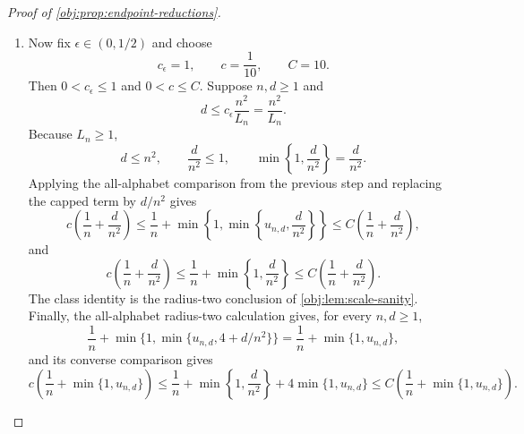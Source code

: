 \documentclass[11pt]{article}
\begin{document}
\begin{proof}[Proof of \cref{obj:prop:endpoint-reductions}]
\begin{enumerate}
\item Now fix \(\epsilon\in(0,1/2)\) and choose
\[
c_\epsilon=1,
\qquad
c=\frac1{10},
\qquad
C=10 .
\]
Then \(0<c_\epsilon\le1\) and \(0<c\le C\).  Suppose \(n,d\ge1\) and
\[
d\le c_\epsilon\frac{n^2}{L_n}=\frac{n^2}{L_n}.
\]
Because \(L_n\ge1\),
\[
d\le n^2,
\qquad
\frac d{n^2}\le1,
\qquad
\min\left\{1,\frac d{n^2}\right\}=\frac d{n^2}.
\]
Applying the all-alphabet comparison from the previous step and replacing the capped term by \(d/n^2\) gives
\[
c\left(\frac1n+\frac d{n^2}\right)
\le
\frac1n+\min\left\{1,\min\left\{u_{n,d},\frac d{n^2}\right\}\right\}
\le
C\left(\frac1n+\frac d{n^2}\right),
\]
and
\[
c\left(\frac1n+\frac d{n^2}\right)
\le
\frac1n+\min\left\{1,\frac d{n^2}\right\}
\le
C\left(\frac1n+\frac d{n^2}\right).
\]
The class identity is the radius-two conclusion of \cref{obj:lem:scale-sanity}.  Finally, the all-alphabet radius-two calculation gives, for every \(n,d\ge1\),
\[
\frac1n+\min\{1,\min\{u_{n,d},4+d/n^2\}\}
=
\frac1n+\min\{1,u_{n,d}\},
\]
and its converse comparison gives
\[
c\left(\frac1n+\min\{1,u_{n,d}\}\right)
\le
\frac1n+\min\left\{1,\frac d{n^2}\right\}+4\min\{1,u_{n,d}\}
\le
C\left(\frac1n+\min\{1,u_{n,d}\}\right).
\]
\end{enumerate}
\end{proof}
\end{document}
